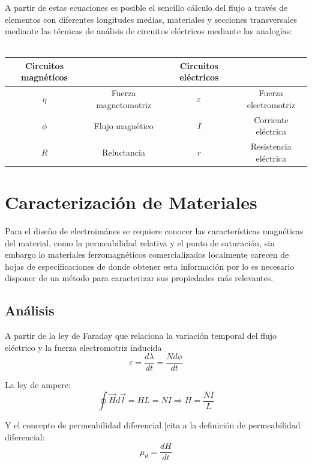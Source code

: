 A partir de estas ecuaciones es posible el sencillo cálculo del flujo a través de  elementos con diferentes longitudes medias, materiales y secciones transversales mediante las técnicas de análisis de circuitos eléctricos mediante las analogías:\\\\

\begin{tabular}{|c|c|c|c|}
\hline 
Circuitos magnéticos &  & Circuitos eléctricos &   \\ 
\hline
$\eta$ & Fuerza magnetomotriz & $\varepsilon$ & Fuerza electromotriz \\ 
\hline 
$\phi$ & Flujo magnético & $I$ & Corriente eléctrica \\ 
\hline 
 $R$ & Reluctancia & $r$& Resistencia eléctrica\\
\hline
\end{tabular} 

\section{Caracterización de Materiales}
\label{sec:related:sec3}

Para el diseño de electroimánes se requiere conocer las características magnéticas del material, como la permeabilidad relativa y el punto de saturación, sin embargo lo materiales ferromagnéticos comercializados localmente carecen de hojas de especificaciones de donde obtener esta información por lo es necesario disponer de un método para caracterizar sus propiedades más relevantes.

\subsection{Análisis}

A partir de la ley de Faraday que relaciona la variación temporal del flujo eléctrico y la fuerza electromotriz inducida
\begin{equation}
	\varepsilon =\frac{d \lambda}{dt} = \frac{N d \phi}{dt}
\end{equation}

La ley de ampere:
\begin{equation}
	\oint {\overrightarrow{H} d \overrightarrow{l}} = HL = NI \Rightarrow H = \frac{NI}{L}
\end{equation}

Y el concepto de permeabilidad diferencial [cita a la definición de permeabilidad diferencial:
\begin{equation}
	\mu_d = \frac{dH}{dt}
\end{equation}

